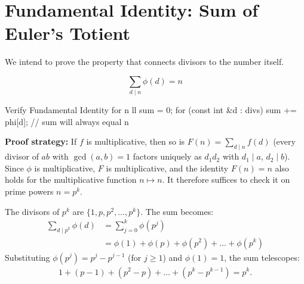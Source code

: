 \documentclass[11pt]{article}
\begin{document}
\newpage
\section{Fundamental Identity: Sum of Euler's Totient}
\label{sec:proof_identity}

We intend to prove the property that connects divisors to the number itself.

\begin{resultbox}
    \begin{equation}
        \sum_{d \mid n} \phi(d) = n \label{eq:euler_identity}
    \end{equation}
\end{resultbox}

\begin{vscode}{Verify Fundamental Identity for n}
ll sum = 0;
for (const int &d : divs)
    sum += phi[d];
// sum will always equal n
\end{vscode}

\textbf{Proof strategy:} If $f$ is multiplicative, then so is $F(n)=\sum_{d\mid n} f(d)$ (every divisor of $ab$ with $\gcd(a,b)=1$ factors uniquely as $d_1 d_2$ with $d_1\mid a$, $d_2\mid b$). Since $\phi$ is multiplicative, $F$ is multiplicative, and the identity $F(n)=n$ also holds for the multiplicative function $n\mapsto n$. It therefore suffices to check it on prime powers $n=p^k$.

\begin{derivation}
    The divisors of $p^k$ are $\{1, p, p^2, \dots, p^k\}$. The sum becomes:
    \begin{align*}
        \sum_{d \mid p^k} \phi(d) & = \sum_{j=0}^k \phi(p^j)                            \\
                                  & = \phi(1) + \phi(p) + \phi(p^2) + \dots + \phi(p^k)
    \end{align*}
    Substituting $\phi(p^j) = p^j - p^{j-1}$ (for $j \ge 1$) and $\phi(1)=1$, the sum telescopes:
    \begin{align*}
        1 + (p-1) + (p^2-p) + \dots + (p^k-p^{k-1}) = p^k.
    \end{align*}
\end{derivation}

\vspace{0.5cm}
\end{document}
